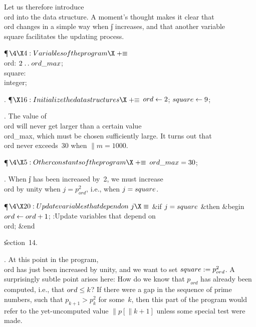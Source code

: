 Let us therefore introduce \\{ord} into the data structure. A moment's
thought makes it clear that \\{ord} changes in a simple way when \|j
increases, and that another variable \\{square} facilitates the
updating process.

\Y\P$\4\X4:Variables of the program\X\mathrel{+}\S$\6
\4\\{ord}: $2\to\\{ord\_max}$;\6
\4\\{square}: \\{integer};\par
\fi

. \P$\X16:Initialize the data structures\X\mathrel{+}\S$\6
$\\{ord}\K2$;\5
$\\{square}\K9$;\par
\fi

. The value of \\{ord} will never get larger than a certain value
\\{ord\_max}, which must be chosen sufficiently large. It turns out that
\\{ord} never exceeds~30 when $\|m=1000$.

\Y\P$\4\X5:Other constants of the program\X\mathrel{+}\S$\6
$\\{ord\_max}=30$;\par
\fi

. When \|j has been increased by~2, we must increase \\{ord} by unity
when $j=p_{ord}^2$, i.e., when $\|j=\\{square}$.

\Y\P$\4\X20:Update variables that depend on~\|j\X\S$\6
\&{if} $\|j=\\{square}$ \1\&{then}\6
\&{begin} $\\{ord}\K\\{ord}+1$;\5
:Update variables that depend on~\\{ord}\X;\6
\&{end}\2\par
\U section~14.\fi

. At this point in the program, \\{ord} has just been increased by unity,
and we want to set $\\{square}:=p_{ord}^2$. A surprisingly subtle point
arises here: How do we know that $p_{ord}$ has already been computed,
i.e., that $\\{ord}\L\|k$? If there were a gap in the sequence of prime
numbers,
such that $p_{k+1}>p_k^2$ for some~$k$, then this part of the program would
refer to the yet-uncomputed value $\|p[\|k+1]$ unless some special test were
made.


